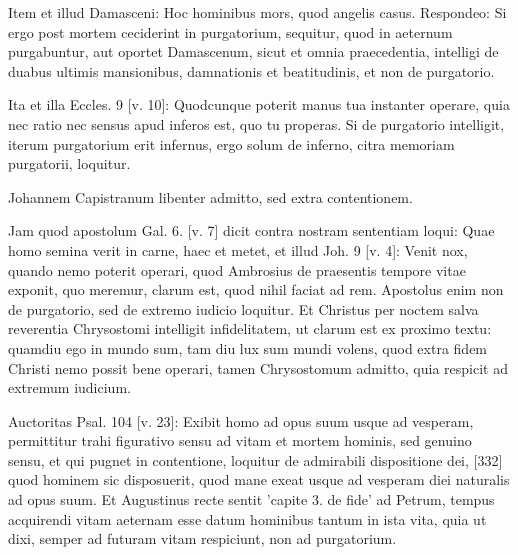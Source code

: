 Item et illud Damasceni: Hoc hominibus mors, quod angelis casus. Respondeo: Si ergo post mortem ceciderint in purgatorium, sequitur, quod in aeternum purgabuntur, aut oportet Damascenum, sicut et omnia praecedentia, intelligi de duabus ultimis mansionibus, damnationis et beatitudinis, et non de purgatorio.

Ita et illa Eccles. 9 [v. 10]: Quodcunque poterit manus tua instanter operare, quia nec ratio nec sensus apud inferos est, quo tu properas. Si de purgatorio intelligit, iterum purgatorium erit infernus, ergo solum de inferno, citra memoriam purgatorii, loquitur.

Johannem Capistranum libenter admitto, sed extra contentionem.

Jam quod apostolum Gal. 6. [v. 7] dicit contra nostram sententiam loqui: Quae homo semina verit in carne, haec et metet, et illud Joh. 9 [v. 4]: Venit nox, quando nemo poterit operari, quod Ambrosius de praesentis tempore vitae exponit, quo meremur, clarum est, quod nihil faciat ad rem. Apostolus enim non de purgatorio, sed de extremo iudicio loquitur. Et Christus per noctem salva reverentia Chrysostomi intelligit infidelitatem, ut clarum est ex proximo textu: quamdiu ego in mundo sum, tam diu lux sum mundi volens, quod extra fidem Christi nemo possit bene operari, tamen Chrysostomum admitto, quia respicit ad extremum iudicium.

Auctoritas Psal. 104 [v. 23]: Exibit homo ad opus suum usque ad vesperam, permittitur trahi figurativo sensu ad vitam et mortem hominis, sed genuino sensu, et qui pugnet in contentione, loquitur de admirabili dispositione dei, [332] quod hominem sic disposuerit, quod mane exeat usque ad vesperam diei naturalis ad opus suum. Et Augustinus recte sentit 'capite 3. de fide' ad Petrum, tempus acquirendi vitam aeternam esse datum hominibus tantum in ista vita, quia ut dixi, semper ad futuram vitam respiciunt, non ad purgatorium.

